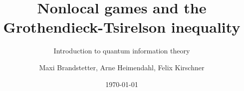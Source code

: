 

		\author{Maxi Brandstetter, Arne Heimendahl, Felix Kirschner}
		\title{Nonlocal games and the Grothendieck-Tsirelson inequality}
		\subtitle{Introduction to quantum information theory}
			\date{\today}
		\begin{frame}
		\maketitle
	\end{frame}
	
%		
	
	

	
	

